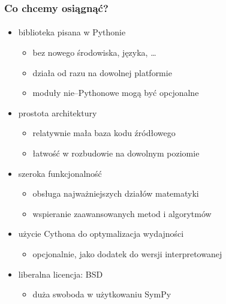 \documentclass{beamer}
\begin{document}
\begin{frame}
    \frametitle{Co chcemy osiągnąć?}
    \framesubtitle{}

    \begin{itemize}
        \item biblioteka pisana w Pythonie
            \begin{itemize}
                \item bez nowego środowiska, języka, \ldots
                \item działa od razu na dowolnej platformie
                \item moduły nie--Pythonowe mogą być opcjonalne
            \end{itemize}
            \pause
        \item prostota architektury
            \begin{itemize}
                \item relatywnie mała baza kodu źródłowego
                \item łatwość w rozbudowie na dowolnym poziomie
            \end{itemize}
            \pause
        \item szeroka funkcjonalność
            \begin{itemize}
                \item obsługa najważniejszych działów matematyki
                \item wspieranie zaawansowanych metod i algorytmów
            \end{itemize}
            \pause
        \item użycie Cythona do optymalizacja wydajności
            \begin{itemize}
                \item opcjonalnie, jako dodatek do wersji interpretowanej
            \end{itemize}
            \pause
        \item liberalna licencja: BSD
            \begin{itemize}
                \item duża swoboda w użytkowaniu SymPy
            \end{itemize}
    \end{itemize}
\end{frame}
\end{document}
